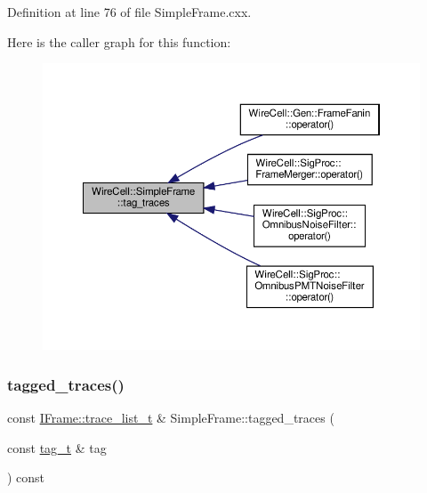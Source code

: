 Definition at line 76 of file Simple\+Frame.\+cxx.

Here is the caller graph for this function\+:
\nopagebreak
\begin{figure}[H]
\begin{center}
\leavevmode
\includegraphics[width=350pt]{class_wire_cell_1_1_simple_frame_a106f413268020b6ea2a87364089bd65c_icgraph}
\end{center}
\end{figure}
\mbox{\label{class_wire_cell_1_1_simple_frame_a141502ebb9e7b55be68073b9782cb17d}} 
\subsubsection{\texorpdfstring{tagged\+\_\+traces()}{tagged\_traces()}}
{\footnotesize\ttfamily const \hyperlink{class_wire_cell_1_1_i_frame_a12f08adf79d21cb9b4862a16193fda8f}{I\+Frame\+::trace\+\_\+list\+\_\+t} \& Simple\+Frame\+::tagged\+\_\+traces (\begin{DoxyParamCaption}\item[{const \hyperlink{class_wire_cell_1_1_i_frame_ae206ba618e10f398625dfeb675a4215a}{tag\+\_\+t} \&}]{tag }\end{DoxyParamCaption}) const\hspace{0.3cm}{\ttfamily [virtual]}}



